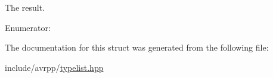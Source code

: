 The result. 

\begin{Desc}
\item[Enumerator: ]\par
\begin{description}
\item[{\em 
\hypertarget{structavrpp_1_1typelist_1_1compare__classes_3_01a_00_01a_01_4_a82354acc99e9018f57f1169b526faecca3d535ecff2e468dea54860c220df0add}{
result}
\label{structavrpp_1_1typelist_1_1compare__classes_3_01a_00_01a_01_4_a82354acc99e9018f57f1169b526faecca3d535ecff2e468dea54860c220df0add}
}]\end{description}
\end{Desc}



The documentation for this struct was generated from the following file:\begin{DoxyCompactItemize}
\item 
include/avrpp/\hyperlink{typelist_8hpp}{typelist.hpp}\end{DoxyCompactItemize}
